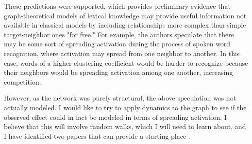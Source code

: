 \documentclass{article}
\begin{document}
These predictions were supported, which provides preliminary evidence that
graph-theoretical models of lexical knowledge may provide useful information not available
in classical models by including relationships more complex than simple target-neighbor
ones "for free." For example, the authors speculate that there may be some sort
of spreading activation during the process of spoken word recognition, where activation
may spread from one neighbor to another. In this case, words of a higher clustering
coefficient would be harder to recognize because their neighbors would be spreading
activation among one another, increasing competition.

However, as the network was purely structural, the above speculation was not
actually modeled. I would like to try to apply dynamics to the graph to see
if the observed effect could in fact be modeled in terms of spreading activation.
I believe that this will involve random walks, which I will need to learn about,
and I have identified two papers that can provide a starting place \citep{r08, noh2004}.



\end{document}
